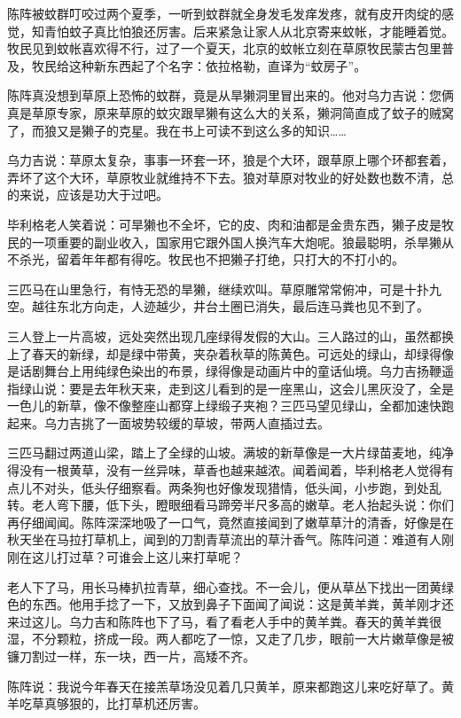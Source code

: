 \par 陈阵被蚊群叮咬过两个夏季，一听到蚊群就全身发毛发痒发疼，就有皮开肉绽的感觉，知青怕蚊子真比怕狼还厉害。后来紧急让家人从北京寄来蚊帐，才能睡着觉。牧民见到蚊帐喜欢得不行，过了一个夏天，北京的蚊帐立刻在草原牧民蒙古包里普及，牧民给这种新东西起了个名字：依拉格勒，直译为“蚊房子”。
\par 陈阵真没想到草原上恐怖的蚊群，竟是从旱獭洞里冒出来的。他对乌力吉说：您俩真是草原专家，原来草原的蚊灾跟旱獭有这么大的关系，獭洞简直成了蚊子的贼窝了，而狼又是獭子的克星。我在书上可读不到这么多的知识……
\par 乌力吉说：草原太复杂，事事一环套一环，狼是个大环，跟草原上哪个环都套着，弄坏了这个大环，草原牧业就维持不下去。狼对草原对牧业的好处数也数不清，总的来说，应该是功大于过吧。
\par 毕利格老人笑着说：可旱獭也不全坏，它的皮、肉和油都是金贵东西，獭子皮是牧民的一项重要的副业收入，国家用它跟外国人换汽车大炮呢。狼最聪明，杀旱獭从不杀光，留着年年都有得吃。牧民也不把獭子打绝，只打大的不打小的。
\par 三匹马在山里急行，有恃无恐的旱獭，继续欢叫。草原雕常常俯冲，可是十扑九空。越往东北方向走，人迹越少，井台土圈已消失，最后连马粪也见不到了。
\par 三人登上一片高坡，远处突然出现几座绿得发假的大山。三人路过的山，虽然都换上了春天的新绿，却是绿中带黄，夹杂着秋草的陈黄色。可远处的绿山，却绿得像是话剧舞台上用纯绿色染出的布景，绿得像是动画片中的童话仙境。乌力吉扬鞭遥指绿山说：要是去年秋天来，走到这儿看到的是一座黑山，这会儿黑灰没了，全是一色儿的新草，像不像整座山都穿上绿缎子夹袍？三匹马望见绿山，全都加速快跑起来。乌力吉挑了一面坡势较缓的草坡，带两人直插过去。
\par 三匹马翻过两道山梁，踏上了全绿的山坡。满坡的新草像是一大片绿苗麦地，纯净得没有一根黄草，没有一丝异味，草香也越来越浓。闻着闻着，毕利格老人觉得有点儿不对头，低头仔细察看。两条狗也好像发现猎情，低头闻，小步跑，到处乱转。老人弯下腰，低下头，瞪眼细看马蹄旁半尺多高的嫩草。老人抬起头说：你们再仔细闻闻。陈阵深深地吸了一口气，竟然直接闻到了嫩草草汁的清香，好像是在秋天坐在马拉打草机上，闻到的刀割青草流出的草汁香气。陈阵问道：难道有人刚刚在这儿打过草？可谁会上这儿来打草呢？
\par 老人下了马，用长马棒扒拉青草，细心查找。不一会儿，便从草丛下找出一团黄绿色的东西。他用手捻了一下，又放到鼻子下面闻了闻说：这是黄羊粪，黄羊刚才还来过这儿。乌力吉和陈阵也下了马，看了看老人手中的黄羊粪。春天的黄羊粪很湿，不分颗粒，挤成一段。两人都吃了一惊，又走了几步，眼前一大片嫩草像是被镰刀割过一样，东一块，西一片，高矮不齐。
\par 陈阵说：我说今年春天在接羔草场没见着几只黄羊，原来都跑这儿来吃好草了。黄羊吃草真够狠的，比打草机还厉害。
